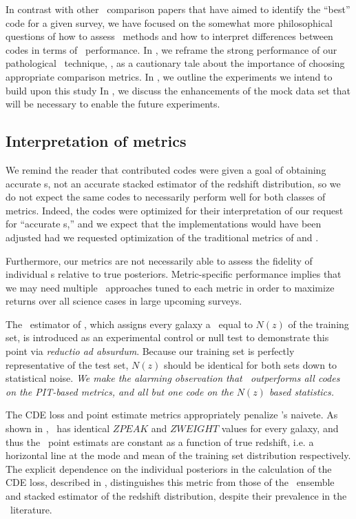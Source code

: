 In contrast with other \pzpdf\ comparison papers that have aimed to identify the ``best'' code for a given survey, we have focused on the somewhat more philosophical questions of how to assess \pzpdf\ methods and how to interpret differences between codes in terms of \pzpdf\ performance.
In , we reframe the strong performance of our pathological \pzpdf\ technique, \trainz, as a cautionary tale about the importance of choosing appropriate comparison metrics.
In , we outline the experiments we intend to build upon this study
In , we discuss the enhancements of the mock data set that will be necessary to enable the future experiments.

\subsection{Interpretation of metrics}
\label{sec:caution}

We remind the reader that contributed codes were given a goal of obtaining accurate \pzpdf s, not an accurate stacked estimator of the redshift distribution, so we do not expect the same codes to necessarily perform well for both classes of metrics.
Indeed, the codes were optimized for their interpretation of our request for ``accurate \pzpdf s,'' and we expect that the implementations would have been adjusted had we requested optimization of the traditional metrics of  and .

Furthermore, our metrics are not necessarily able to assess the fidelity of individual \pzpdf s relative to true posteriors.
Metric-specific performance implies that we may need multiple \pzpdf\ approaches tuned to each metric in order to maximize returns over all science cases in large upcoming surveys.

The \trainz\ estimator of , which assigns every galaxy a \pzpdf\ equal to $N(z)$ of the training set, is introduced as an experimental control or null test to demonstrate this point via \textit{reductio ad absurdum}.
Because our training set is perfectly representative of the test set, $N(z)$ should be identical for both sets down to statistical noise.
\textit{We make the alarming observation that \trainz\ outperforms all codes on the PIT-based metrics, and all but one code on the $N(z)$ based statistics.}

The CDE loss and point estimate metrics appropriately penalize \trainz's naivete.
As shown in , \trainz ~has identical $ZPEAK$ and $ZWEIGHT$ values for every galaxy, and thus the \pz\ point estimats are constant as a function of true redshift, i.e. a horizontal line at the mode and mean of the training set distribution respectively.
The explicit dependence on the individual posteriors in the calculation of the CDE loss, described in , distinguishes this metric from those of the \pzpdf\ ensemble and stacked estimator of the redshift distribution, despite their prevalence in the \pz\ literature.

